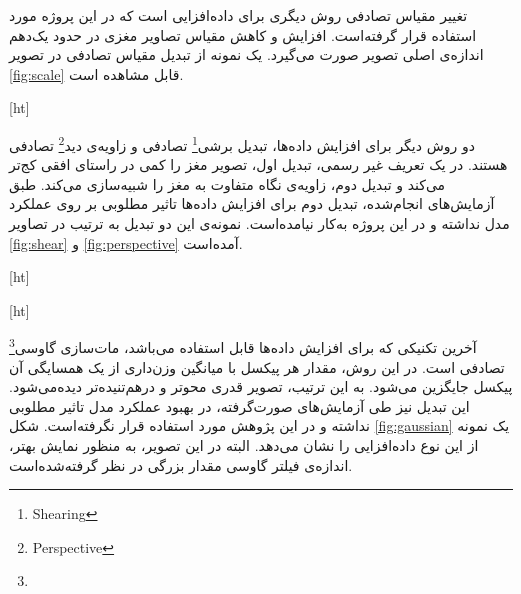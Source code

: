 تغییر مقیاس تصادفی روش دیگری برای داده‌افزایی است که در این پروژه مورد استفاده قرار گرفته‌است.
افزایش و کاهش مقیاس تصاویر مغزی در حدود یک‌دهم اندازه‌ی اصلی تصویر صورت می‌گیرد.
یک نمونه از تبدیل مقیاس تصادفی در تصویر 
\ref{fig:scale} قابل مشاهده است.

[ht]

دو روش دیگر برای افزایش داده‌ها،
 تبدیل برشی\footnote{Shearing}
تصادفی و 
زاویه‌ی دید\footnote{Perspective}
تصادفی هستند.
در یک تعریف غیر رسمی، تبدیل اول، تصویر مغز را کمی در راستای افقی کج‌تر می‌کند و تبدیل دوم، زاویه‌ی نگاه متفاوت به مغز را شبیه‌سازی می‌کند.
طبق آزمایش‌های انجام‌شده، تبدیل دوم برای افزایش داده‌ها تاثیر مطلوبی بر روی عملکرد مدل نداشته و در این پروژه به‌کار نیامده‌است.
نمونه‌ی این دو تبدیل به ترتیب در تصاویر \ref{fig:shear} و \ref{fig:perspective} آمده‌است.


[ht]



[ht]

آخرین تکنیکی که برای افزایش داده‌ها قابل استفاده می‌باشد، 
مات‌سازی گاوسی\footnote{}
تصادفی است.
در این روش، مقدار هر پیکسل با میانگین وزن‌داری از یک همسایگی آن پیکسل جایگزین می‌شود.
به این ترتیب، تصویر قدری محو‌تر و درهم‌تنیده‌تر دیده‌می‌شود.
این تبدیل نیز طی آزمایش‌های صورت‌گرفته، در بهبود عملکرد مدل تاثیر مطلوبی نداشته و در این پژوهش مورد استفاده قرار نگرفته‌است.
شکل \ref{fig:gaussian} یک نمونه از این نوع داده‌افزایی را نشان می‌دهد.
البته در این تصویر، به منظور نمایش بهتر، اندازه‌ی فیلتر گاوسی مقدار بزرگی در نظر گرفته‌شده‌است.

